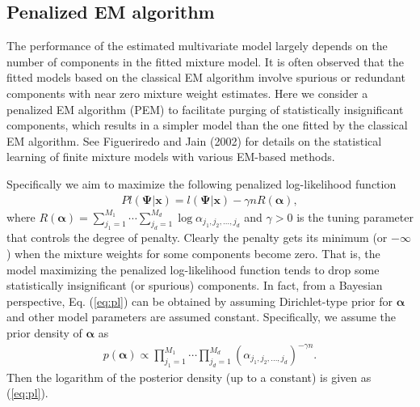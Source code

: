 \documentclass[11pt]{article}
\def\a{\alpha} \def\b{\beta}
\def\bea{\begin{eqnarray*}} \def\eea{\end{eqnarray*}}
\def\beq{\begin{eqnarray}} \def\eeq{\end{eqnarray}}
\begin{document}
\subsection{Penalized EM algorithm}
The performance of the estimated multivariate model largely depends on the number of components in the fitted mixture model. It is often observed that the fitted models based on the classical EM algorithm involve spurious or redundant components with near zero mixture weight estimates. Here we consider a penalized EM algorithm (PEM) to facilitate purging of statistically insignificant components, which results in a simpler model than the one fitted by the classical EM algorithm. See Figueriredo and Jain (2002)\nocite{Figueiredo} for details on the statistical learning of finite mixture models with various EM-based methods.
 
Specifically we aim to maximize the following penalized log-likelihood function 
\beq\label{eq:pl}
Pl(\bm{\Psi}|\bm{x}) = l(\bm{\Psi}|\bm{x}) - \gamma n R(\bm{\a}),
\eeq 
where $R(\bm{\a}) = \sum_{j_1 = 1}^{M_1} \cdots\sum_{j_d = 1}^{M_d}\log \a_{j_1,j_2,\ldots,j_d}$ and $\gamma > 0$ is the tuning parameter that controls the degree of penalty. Clearly the penalty gets its minimum (or $-\infty$) when the mixture weights for some components become zero. That is, the model maximizing the penalized log-likelihood function tends to drop some statistically insignificant (or spurious) components. In fact, from a Bayesian perspective, Eq. (\ref{eq:pl}) can be obtained by assuming Dirichlet-type prior for $\bm{\a}$ and other model parameters are assumed constant. Specifically, we assume the prior density of $\bm{\a}$ as
\bea
p(\bm{\a}) \propto \prod_{j_1 = 1}^{M_1} \cdots\prod_{j_d = 1}^{M_d}\left(\a_{j_1,j_2,\ldots,j_d}\right)^{-\gamma n }.
\eea
Then the logarithm of the posterior density (up to a constant) is given as (\ref{eq:pl}). 
\end{document}
